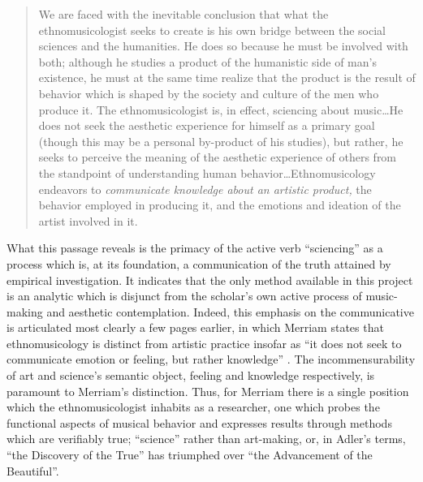 \begin{quote}
We are faced with the inevitable conclusion that what the
ethnomusicologist seeks to create is his own bridge between the social
sciences and the humanities. He does so because he must be involved with
both; although he studies a product of the humanistic side of man's
existence, he must at the same time realize that the product is the
result of behavior which is shaped by the society and culture of the men
who produce it. The ethnomusicologist is, in effect, sciencing about
music\ldots He does not seek the aesthetic experience for himself as a
primary goal (though this may be a personal by-product of his studies),
but rather, he seeks to perceive the meaning of the aesthetic experience
of others from the standpoint of understanding human
behavior\ldots Ethnomusicology endeavors to \emph{communicate knowledge
about an artistic product,} the behavior employed in producing it, and
the emotions and ideation of the artist involved in it.
\autocite*[25]{merriam_anthropology_1964}
\end{quote}

What this passage reveals is the primacy of the active verb
``sciencing'' as a process which is, at its foundation, a communication
of the truth attained by empirical investigation. It indicates that the
only method available in this project is an analytic which is disjunct
from the scholar's own active process of music-making and aesthetic
contemplation. Indeed, this emphasis on the communicative is articulated
most clearly a few pages earlier, in which Merriam states that
ethnomusicology is distinct from artistic practice insofar as ``it does
not seek to communicate emotion or feeling, but rather knowledge''
\autocite[19]{merriam_anthropology_1964}. The incommensurability of art
and science's semantic object, feeling and knowledge respectively, is
paramount to Merriam's distinction. Thus, for Merriam there is a single
position which the ethnomusicologist inhabits as a researcher, one which
probes the functional aspects of musical behavior and expresses results
through methods which are verifiably true; ``science'' rather than
art-making, or, in Adler's terms, ``the Discovery of the True'' has
triumphed over ``the Advancement of the Beautiful''.

